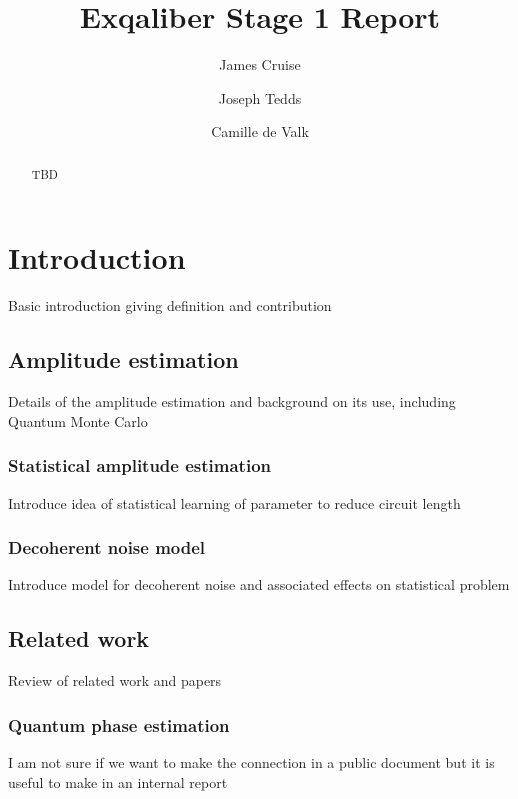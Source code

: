 \documentclass[a4paper,onecolumn,11pt,unpublished]{quantumarticle}
\begin{document}
\title{Exqaliber Stage 1 Report}

\author{James Cruise}
\author{Joseph Tedds}
\author{Camille de Valk}
\maketitle

\begin{abstract}
 TBD
\end{abstract}


\section{Introduction}
Basic introduction giving definition and contribution

\subsection{Amplitude estimation}
Details of the amplitude estimation and background on its use, including Quantum Monte Carlo

\subsubsection{Statistical amplitude estimation}
Introduce idea of statistical learning of parameter to reduce circuit length

\subsubsection{Decoherent noise model}
Introduce model for decoherent noise and associated effects on statistical problem

\subsection{Related work}
Review of related work and papers

\subsubsection{Quantum phase estimation}
I am not sure if we want to make the connection in a public document but it is useful to make in an internal report
\end{document}
